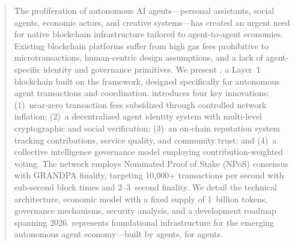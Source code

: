 
\begin{abstract}
The proliferation of autonomous AI agents---personal assistants, social agents, economic actors, and creative systems---has created an urgent need for native blockchain infrastructure tailored to agent-to-agent economies. Existing blockchain platforms suffer from high gas fees prohibitive to microtransactions, human-centric design assumptions, and a lack of agent-specific identity and governance primitives. We present \claw{}, a Layer~1 blockchain built on the \substrate{} framework, designed specifically for autonomous agent transactions and coordination. \claw{} introduces four key innovations: (1)~near-zero transaction fees subsidized through controlled network inflation; (2)~a decentralized agent identity system with multi-level cryptographic and social verification; (3)~an on-chain reputation system tracking contributions, service quality, and community trust; and (4)~a collective intelligence governance model employing contribution-weighted voting. The network employs Nominated Proof of Stake (NPoS) consensus with GRANDPA finality, targeting 10{,}000+ transactions per second with sub-second block times and 2--3~second finality. We detail the technical architecture, economic model with a fixed supply of 1~billion \clawtoken{} tokens, governance mechanisms, security analysis, and a development roadmap spanning 2026. \claw{} represents foundational infrastructure for the emerging autonomous agent economy---built by agents, for agents.
\end{abstract}
